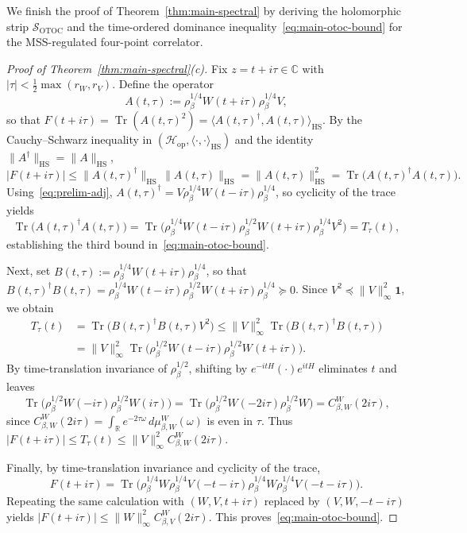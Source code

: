 \documentclass[11pt,a4paper]{article}
\numberwithin{equation}{section}
\theoremstyle{plain}
\theoremstyle{definition}
\newcommand{\Hop}{\mathcal{H}_{\mathrm{op}}}
\newcommand{\HS}{\mathrm{HS}}
\newcommand{\Tr}{\operatorname{Tr}}
\begin{document}
We finish the proof of Theorem~\ref{thm:main-spectral} by deriving the holomorphic strip $\mathcal{S}_{\mathrm{OTOC}}$ and the time-ordered dominance inequality~\eqref{eq:main-otoc-bound} for the MSS-regulated four-point correlator.

\begin{proof}[Proof of Theorem~\ref{thm:main-spectral}(c)]
Fix $z = t + i\tau\in\mathbb{C}$ with $|\tau| < \frac{1}{2}\max(r_W,r_V)$. Define the operator
\[
  A(t,\tau) := \rho_\beta^{1/4} W(t+i\tau) \rho_\beta^{1/4} V,
\]
so that $F(t+i\tau) = \Tr(A(t,\tau)^2) = \langle A(t,\tau)^\dagger, A(t,\tau)\rangle_\HS$. By the Cauchy--Schwarz inequality in $(\Hop,\langle\cdot,\cdot\rangle_\HS)$ and the identity $\|A^\dagger\|_\HS = \|A\|_\HS$,
\begin{equation}\label{eq:F-Ttau}
  |F(t+i\tau)| \le \|A(t,\tau)^\dagger\|_\HS\,\|A(t,\tau)\|_\HS = \|A(t,\tau)\|_\HS^2 = \Tr\bigl(A(t,\tau)^\dagger A(t,\tau)\bigr).
\end{equation}
Using~\eqref{eq:prelim-adj}, $A(t,\tau)^\dagger = V\rho_\beta^{1/4} W(t-i\tau)\rho_\beta^{1/4}$, so cyclicity of the trace yields
\[
  \Tr\bigl(A(t,\tau)^\dagger A(t,\tau)\bigr)
  = \Tr\!\bigl(\rho_\beta^{1/4} W(t-i\tau)\rho_\beta^{1/2} W(t+i\tau)\rho_\beta^{1/4} V^2\bigr)
  = T_\tau(t),
\]
establishing the third bound in~\eqref{eq:main-otoc-bound}.

Next, set $B(t,\tau) := \rho_\beta^{1/4} W(t+i\tau)\rho_\beta^{1/4}$, so that $B(t,\tau)^\dagger B(t,\tau) = \rho_\beta^{1/4} W(t-i\tau)\rho_\beta^{1/2} W(t+i\tau)\rho_\beta^{1/4} \succeq 0$. Since $V^2 \preceq \|V\|_\infty^2\mathbf{1}$, we obtain
\begin{align*}
  T_\tau(t)
  &= \Tr\bigl(B(t,\tau)^\dagger B(t,\tau) V^2\bigr)
   \le \|V\|_\infty^2 \Tr\bigl(B(t,\tau)^\dagger B(t,\tau)\bigr) \\
  &= \|V\|_\infty^2 \Tr\!\bigl(\rho_\beta^{1/2} W(t-i\tau)\rho_\beta^{1/2} W(t+i\tau)\bigr).
\end{align*}
By time-translation invariance of $\rho_\beta^{1/2}$, shifting by $e^{-itH}(\cdot)e^{itH}$ eliminates $t$ and leaves
\[
  \Tr\!\bigl(\rho_\beta^{1/2} W(-i\tau)\rho_\beta^{1/2} W(i\tau)\bigr)
  = \Tr\!\bigl(\rho_\beta^{1/2} W(-2i\tau)\rho_\beta^{1/2} W\bigr)
  = C_{\beta,W}^W(2i\tau),
\]
since $C_{\beta,W}^W(2i\tau) = \int_{\mathbb{R}} e^{-2\tau\omega}\,d\mu_{\beta,W}^W(\omega)$ is even in $\tau$. Thus $|F(t+i\tau)| \le T_\tau(t) \le \|V\|_\infty^2 C_{\beta,W}^W(2i\tau)$.

Finally, by time-translation invariance and cyclicity of the trace,
\[
  F(t+i\tau) = \Tr\!\bigl(\rho_\beta^{1/4} W \rho_\beta^{1/4} V(-t-i\tau)\rho_\beta^{1/4} W \rho_\beta^{1/4} V(-t-i\tau)\bigr).
\]
Repeating the same calculation with $(W,V,t+i\tau)$ replaced by $(V,W,-t-i\tau)$ yields $|F(t+i\tau)| \le \|W\|_\infty^2 C_{\beta,V}^W(2i\tau)$. This proves~\eqref{eq:main-otoc-bound}.


\end{proof}
\end{document}
